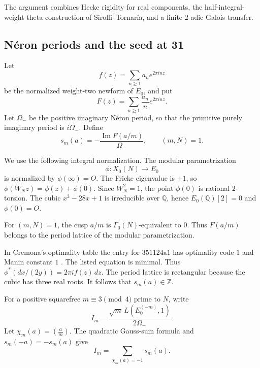 \documentclass[11pt]{article}
\begin{document}
The argument combines Hecke rigidity
for real components, the
half-integral-weight theta construction of
Sirolli--Tornar\'ia, and a finite $2$-adic
Galois transfer.

\subsection{N\'eron periods and the seed at 31}

Let
\[
f(z)=\sum_{n\ge1}a_n e^{2\pi inz}
\]
be the normalized weight-two newform of $E_0$, and put
\[
F(z)=\sum_{n\ge1}\frac{a_n}{n}e^{2\pi inz}.
\]
Let $\Omega_-$ be the positive imaginary N\'eron
period, so that the primitive purely imaginary period is $i\Omega_-$. Define
\[
s_m(a)=-\frac{\operatorname{Im}F(a/m)}{\Omega_-},
\qquad (m,N)=1.
\]

We use the following integral normalization.
The modular parametrization
\[
\phi:X_0(N)\longrightarrow E_0
\]
is normalized by $\phi(\infty)=O$.
The Fricke eigenvalue is $+1$, so
$\phi(W_Nz)=\phi(z)+\phi(0)$.
Since $W_N^2=1$, the point $\phi(0)$ is rational
$2$-torsion. The cubic $x^3-28x+1$ is
irreducible over $\mathbb Q$, hence
$E_0(\mathbb Q)[2]=0$ and $\phi(0)=O$.

For $(m,N)=1$, the cusp $a/m$ is
$\Gamma_0(N)$-equivalent to $0$. Thus
$F(a/m)$ belongs to the period lattice of
the modular parametrization.

In Cremona's optimality table the entry for $351124\mathrm{a}1$
has optimality code $1$ and Manin constant $1$ \cite{Cremona}.
The listed equation is minimal. Thus $\phi^*(dx/(2y))=2\pi i f(z)\,dz$.
The period lattice is rectangular because the cubic has three real roots.
It follows that $s_m(a)\in\mathbb Z$.

For a positive squarefree $m\equiv3\pmod4$
prime to $N$, write
\[
I_m=
\frac{\sqrt m\,L(E_0^{(-m)},1)}{2\Omega_-}.
\]
Let $\chi_m(a)=\left(\frac a m\right)$.
The quadratic Gauss-sum formula and
$s_m(-a)=-s_m(a)$ give
\begin{equation}\label{eq:half-sum-new}
I_m=\sum_{\chi_m(a)=-1}s_m(a).
\end{equation}
\end{document}
